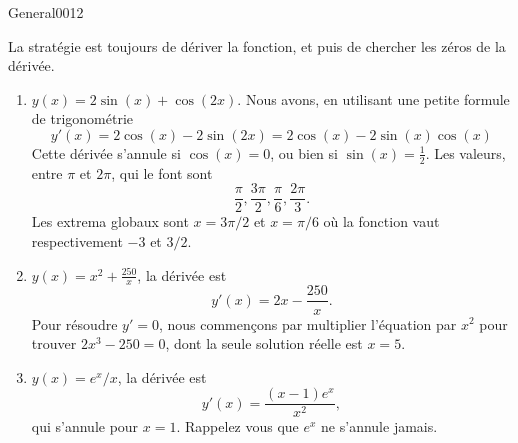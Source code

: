 \begin{corrige}{General0012}

La stratégie est toujours de dériver la fonction, et puis de chercher les zéros de la dérivée.

\begin{enumerate}

\item
$y(x)=2\sin(x)+\cos(2x)$. Nous avons, en utilisant une petite formule de trigonométrie 
\begin{equation}
	y'(x)=2\cos(x)-2\sin(2x)=2\cos(x)-2\sin(x)\cos(x)
\end{equation}
Cette dérivée s'annule si $\cos(x)=0$, ou bien si $\sin(x)=\frac{ 1 }{2}$. Les valeurs, entre $\pi$ et $2\pi$, qui le font sont
\begin{equation}
	\frac{ \pi }{ 2 },\frac{ 3\pi }{2},\frac{ \pi }{ 6 },\frac{ 2\pi }{ 3 }.
\end{equation}
Les extrema globaux sont $x=3\pi/2$ et $x=\pi/6$ où la fonction vaut respectivement $-3$ et $3/2$.

\item
$y(x)=x^2+\frac{ 250 }{ x }$, la dérivée est
\begin{equation}
	y'(x)=2x-\frac{ 250 }{ x }.
\end{equation}
Pour résoudre $y'=0$, nous commençons par multiplier l'équation par $x^2$ pour trouver $2x^3-250=0$, dont la seule solution réelle est $x=5$.

\item
$y(x)=e^x/x$, la dérivée est
\begin{equation}
	y'(x)=\frac{ (x-1) e^{x} }{ x^2 },
\end{equation}
qui s'annule pour $x=1$. Rappelez vous que $e^x$ ne s'annule jamais.
\end{enumerate}


\end{corrige}
